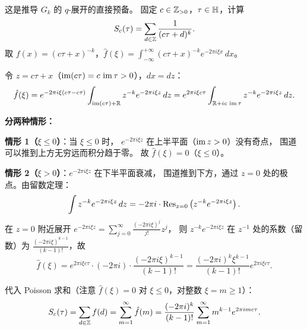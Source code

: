 \begin{example}
\label{ex:poisson-for-eisenstein}
这是推导 $G_k$ 的 $q$-展开的直接预备。
固定 $c \in \mathbb{Z}_{>0}$，$\tau \in \mathbb{H}$，计算
\[
  S_c(\tau) = \sum_{d \in \mathbb{Z}} \frac{1}{(c\tau + d)^k}.
\]
取 $f(x) = (c\tau + x)^{-k}$，$\hat{f}(\xi) = \int_{-\infty}^{+\infty} (c\tau + x)^{-k} e^{-2\pi i \xi x}\, dx$。

令 $z = c\tau + x$（$\operatorname{im}(c\tau) = c\, \operatorname{im}\tau > 0$），$dx = dz$：
\[
  \hat{f}(\xi)
  = e^{-2\pi i \xi(c\tau - c\tau)} \int_{\operatorname{im}(c\tau) + \mathbb{R}} z^{-k} e^{-2\pi i\xi z}\, dz
  = e^{2\pi i \xi c\tau} \int_{\mathbb{R} + i c\, \operatorname{im}\tau} z^{-k} e^{-2\pi i \xi z}\, dz.
\]

\textbf{分两种情形：}

\textbf{情形 1（$\xi \leq 0$）}：当 $\xi \leq 0$ 时，
$e^{-2\pi i\xi z}$ 在上半平面（$\operatorname{im} z > 0$）没有奇点，
围道可以推到上方无穷远而积分趋于零。
故 $\hat{f}(\xi) = 0$（$\xi \leq 0$）。

\textbf{情形 2（$\xi > 0$）}：$e^{-2\pi i\xi z}$ 在下半平面衰减，
围道推到下方，通过 $z = 0$ 处的极点。由留数定理：
\[
  \int z^{-k} e^{-2\pi i\xi z}\, dz = -2\pi i \cdot \mathrm{Res}_{z=0}\left(z^{-k} e^{-2\pi i\xi z}\right).
\]
在 $z = 0$ 附近展开 $e^{-2\pi i\xi z} = \sum_{j=0}^\infty \frac{(-2\pi i\xi)^j}{j!} z^j$，
则 $z^{-k} e^{-2\pi i\xi z}$ 在 $z^{-1}$ 处的系数（留数）为
$\frac{(-2\pi i\xi)^{k-1}}{(k-1)!}$，故
\[
  \hat{f}(\xi) = e^{2\pi i\xi c\tau} \cdot (-2\pi i) \cdot \frac{(-2\pi i\xi)^{k-1}}{(k-1)!}
  = \frac{(-2\pi i)^k \xi^{k-1}}{(k-1)!} e^{2\pi i\xi c\tau}.
\]

代入 Poisson 求和（注意 $\hat{f}(\xi) = 0$ 对 $\xi \leq 0$，对整数 $\xi = m \geq 1$）：
\[
  S_c(\tau) = \sum_{d \in \mathbb{Z}} f(d) = \sum_{m=1}^{\infty} \hat{f}(m)
  = \frac{(-2\pi i)^k}{(k-1)!} \sum_{m=1}^{\infty} m^{k-1} e^{2\pi i m c\tau}.
\]
\end{example}


